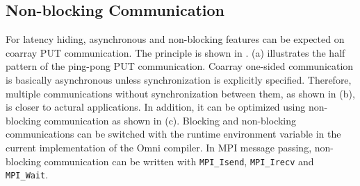\subsection{Non-blocking Communication}

For latency hiding, asynchronous and non-blocking features can be expected 
on coarray PUT communication.
The principle is shown in .
%
 (a) illustrates the half pattern of the ping-pong PUT communication.
Coarray one-sided communication is basically asynchronous unless 
synchronization is explicitly specified. Therefore, multiple communications
without synchronization between them, as shown in (b), is closer to actural applications.
In addition, it can be optimized using non-blocking communication as shown in (c).
Blocking and non-blocking communications can be switched with the runtime environment
variable in the current implementation of the Omni compiler.
In MPI message passing, non-blocking communication can be written with 
{\tt MPI\_Isend}, {\tt MPI\_Irecv} and {\tt MPI\_Wait}.

